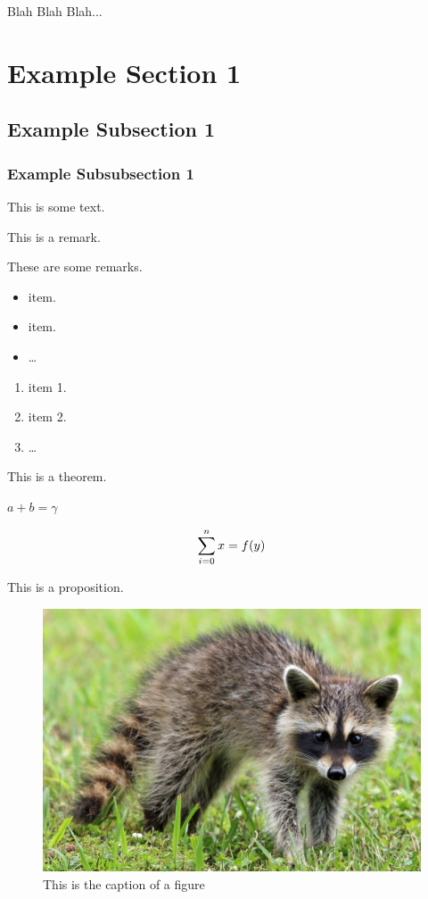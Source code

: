 Blah Blah Blah...

\section{Example Section 1}

\subsection{Example Subsection 1}

\subsubsection{Example Subsubsection 1}

This is some text.

\begin{remark}
   This is a remark.
\end{remark}

\begin{remarks}
   These are some remarks.

   \begin{itemize}
      \item item.
      \item item.
      \item \dots
   \end{itemize}

   \begin{enumerate}
      \item item 1.
      \item item 2.
      \item \dots
   \end{enumerate}
\end{remarks}

\begin{theorem} 
   This is a theorem.

   $a + b = \gamma$

   $$
   \sum_{i = 0}^{n} x = f\!\left(y\right)
   $$
\end{theorem}

\begin{proposition}
   This is a proposition.
\end{proposition}

\subtitle{Example Figure}

\begin{figure}[H]
   \centering
   \includegraphics[scale=0.2]{../resources/racoon.jpg}
   \caption[Racoon]
      {This is the caption of a figure}
\end{figure}